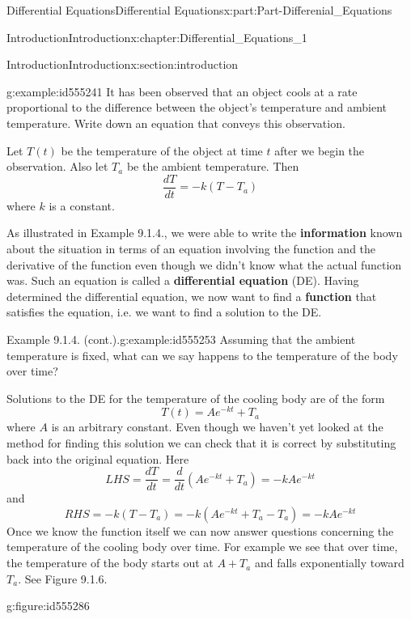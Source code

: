 \documentclass[oneside,10pt,]{book}
\newcommand{\terminology}[1]{\textbf{#1}}
\numberwithin{equation}{section}
\begin{document}
\begin{partptx}{Differential Equations}{}{Differential Equations}{}{}{x:part:Part-Differenial_Equations}
\begin{chapterptx}{Introduction}{}{Introduction}{}{}{x:chapter:Differential_Equations_1}
\begin{sectionptx}{Introduction}{}{Introduction}{}{}{x:section:introduction}
\begin{example}{}{g:example:id555241}%
It has been observed that an object cools at a rate proportional to the difference between the object's temperature and ambient temperature. Write down an equation that conveys this observation.%
\par\smallskip%
\noindent\hypertarget{g:solution:id555219}{}Let \(T(t)\) be the temperature of the object at time \(t\) after we begin the observation. Also let \(T_a\) be the ambient temperature. Then%
\begin{equation*}
\frac{dT}{dt}=-k(T-T_a)
\end{equation*}
where \(k\) is a constant.%
\end{example}
As illustrated in Example 9.1.4., we were able to write the \terminology{information} known about the situation in terms of an equation involving the function and the derivative of the function even though we didn’t know what the actual function was. Such an equation is called a \terminology{differential equation} (DE). Having determined the differential equation, we now want to find a \terminology{function} that satisfies the equation, i.e. we want to find a solution to the DE.%
\begin{example}{Example 9.1.4. (cont.).}{g:example:id555253}%
Assuming that the ambient temperature is fixed, what can we say happens to the temperature of the body over time?%
\par\smallskip%
\noindent\hypertarget{g:solution:id555291}{}Solutions to the DE for the temperature of the cooling body are of the form%
\begin{equation*}
T(t)=Ae^{-kt}+T_a 
\end{equation*}
where \(A\) is an arbitrary constant. Even though we haven’t yet looked at the method for finding this solution we can check that it is correct by substituting back into the original equation. Here%
\begin{equation*}
LHS=\frac{dT}{dt}=\frac{d}{dt}\left(Ae^{-kt}+T_a \right)=-kAe^{-kt} 
\end{equation*}
and%
\begin{equation*}
RHS=-k(T-T_a)=-k(Ae^{-kt}+T_a-T_a)=-kAe^{-kt}
\end{equation*}
Once we know the function itself we can now answer questions concerning the temperature of the cooling body over time. For example we see that over time, the temperature of the body starts out at \(A+T_a\) and falls exponentially toward \(T_a\). See Figure 9.1.6. \begin{figureptx}{}{g:figure:id555286}{}%

\end{figureptx}
\end{example}
\end{sectionptx}
\end{chapterptx}
\end{partptx}
\end{document}
